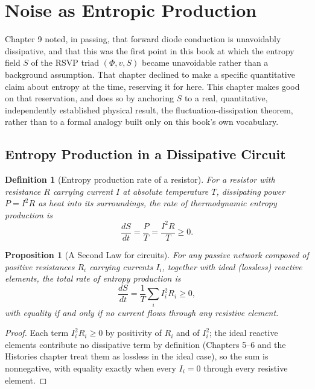 \documentclass[12pt]{article}
\newtheorem{definition}{Definition}
\newtheorem{proposition}{Proposition}
\begin{document}
\section{Noise as Entropic Production}

Chapter 9 noted, in passing, that forward diode conduction is unavoidably dissipative, and that this was the first point in this book at which the entropy field $S$ of the RSVP triad $(\Phi, v, S)$ became unavoidable rather than a background assumption. That chapter declined to make a specific quantitative claim about entropy at the time, reserving it for here. This chapter makes good on that reservation, and does so by anchoring $S$ to a real, quantitative, independently established physical result, the fluctuation-dissipation theorem, rather than to a formal analogy built only on this book's own vocabulary.

\subsection{Entropy Production in a Dissipative Circuit}

\begin{definition}[Entropy production rate of a resistor]
For a resistor with resistance $R$ carrying current $I$ at absolute temperature $T$, dissipating power $P = I^2 R$ as heat into its surroundings, the rate of thermodynamic entropy production is
\[
\frac{dS}{dt} = \frac{P}{T} = \frac{I^2 R}{T} \geq 0.
\]
\end{definition}

\begin{proposition}[A Second Law for circuits]
For any passive network composed of positive resistances $R_i$ carrying currents $I_i$, together with ideal (lossless) reactive elements, the total rate of entropy production is
\[
\frac{dS}{dt} = \frac{1}{T}\sum_i I_i^2 R_i \geq 0,
\]
with equality if and only if no current flows through any resistive element.
\end{proposition}

\begin{proof}
Each term $I_i^2 R_i \geq 0$ by positivity of $R_i$ and of $I_i^2$; the ideal reactive elements contribute no dissipative term by definition (Chapters 5--6 and the Histories chapter treat them as lossless in the ideal case), so the sum is nonnegative, with equality exactly when every $I_i = 0$ through every resistive element.
\end{proof}
\end{document}

